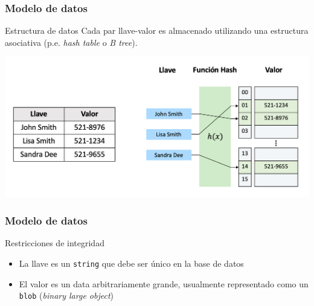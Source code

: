 \begin{frame}
    \frametitle{Modelo de datos}

    \begin{block}{Estructura de datos}
        Cada par llave-valor es almacenado utilizando una estructura asociativa (p.e. \textit{hash table} o \textit{B tree}). 

        \includegraphics[width=\textwidth]{img/db-example.png}
    \end{block}

\end{frame}

\begin{frame}
    \frametitle{Modelo de datos}

    \begin{block}{Restricciones de integridad}
        \begin{itemize}
            \item La llave es un \texttt{string} que debe ser único en la base de datos
            \item El valor es un data arbitrariamente grande, usualmente representado como un \texttt{blob} (\textit{binary large object})
        \end{itemize}

    \end{block}

\end{frame}

